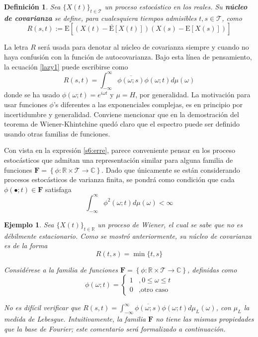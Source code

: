\documentclass[12pt,letterpaper]{book}
\newtheorem{definicion}{Definición}[chapter]
\newtheorem{ejemplo}{Ejemplo}[chapter]
\newcommand{\R}{\mathbb{R}}
\newcommand{\C}{\mathbb{C}}
\newcommand{\intR}{\int_{-\infty}^{\infty}}
\newcommand{\ef}{\mathbf{F}}
\newcommand{\E}[1]{\mathrm{E}\left[ #1 \right]}
\newcommand{\xt}{$\{X(t)\}_{t\in \mathcal{T}}$ }
\newcommand{\xtin}[1]{$\{X(t)\}_{t\in \mathcal{ #1 }}$ }
\begin{document}
\begin{definicion}
Sea \xt un proceso estocástico en los reales. Su \textbf{núcleo de covarianza} se define, para cualesquiera tiempos admisibles $t,s\in\mathcal{T}$, como
\begin{equation}
R(s,t) := \E{\overline{\left( X(t)-\E{X(t)} \right)}\left( X(s)-\E{X(s)} \right)}
\end{equation}
\label{s6:kernel}
\end{definicion}

La letra $R$ será usada para denotar al núcleo de covarianza siempre y cuando no haya confusión con la función de autocovarianza. 
%
Bajo esta línea de pensamiento, la ecuación \ref{lazy1} puede escribirse como
\begin{equation}
R(s,t) = \intR \overline{\phi(\omega;s)}\phi(\omega;t) d\mu(\omega)
\label{s6:erre}
\end{equation}
donde se ha usado $\phi(\omega; t) = e^{i \omega t}$ y $\mu = H$, por generalidad.
%
La motivación para usar funciones $\phi$'s diferentes a las exponenciales complejas, es en principio por incertidumbre y generalidad.
%
Conviene mencionar que en la demostración del teorema de Wiener-Khintchine quedó claro que el espectro puede ser definido usando otras familias de funciones.

Con vista en la expresión \ref{s6:erre}, parece conveniente pensar en los proceso estocásticos que admitan una representación similar para alguna familia de funciones $\ef = \left\{ \phi: \R \times \mathcal{T} \rightarrow \C \right\}$. 
%
Dado que únicamente se están considerando procesos estocásticos de varianza finita, se pondrá como condición que cada $\phi(\bullet;t) \in \ef$ satisfaga
\begin{equation}
\intR \phi^{2}(\omega;t) d\mu(\omega) < \infty
\end{equation}

\begin{ejemplo}
Sea \xtin{\R} un proceso de Wiener, el cual se sabe que no es débilmente estacionario.
%
Como se mostró anteriormente, su núcleo de covarianza es de la forma
\begin{equation}
R(t,s) = \min \{ t , s \}
\end{equation}

Considérese a la familia de funciones $\ef = \left\{ \phi: \R \times \mathcal{T} \rightarrow \C \right\}$, definidas como
\begin{equation}
\phi(\omega; t) = \begin{cases}
1 &, 0 \leq \omega \leq t \\
0 &, \text{otro caso}
\end{cases}
\end{equation}

No es difícil verificar que $R(s,t) = \intR \overline{\phi(\omega;s)}\phi(\omega;t) d\mu_L(\omega)$, con $\mu_L$ la medida de Lebesgue.
%
Intuitivamente, la familia $\ef$ no tiene las mismas propiedades que la base de Fourier; este comentario será formalizado a continuación.
\end{ejemplo}
\end{document}
